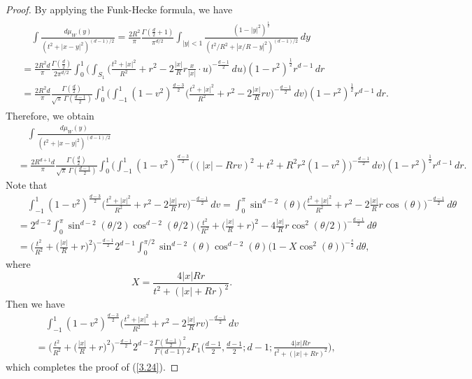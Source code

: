 \documentclass[10pt]{amsart}
\theoremstyle{plain}
\theoremstyle{remark}
\numberwithin{equation}{section}
\begin{document}
\begin{proof}
 


By applying the Funk-Hecke formula, we have  
\begin{align*}
\begin{split} 
&\quad \int \frac{ d\mu_W(y) }{ ( t^2+|x-y|^2 )^{(d-1)/2} }  = \frac{2R^2}{\pi}   \frac{ \Gamma(\frac{d}{2}+1) }{\pi^{ d/2 }}   \int_{ |y|<1 } \frac{ (1-|y|^2)^{ \frac12 } }{  (t^2/R^2+|x/R-y|^2)^{(d-1)/2}  } \,dy
\\
&= \frac{2R^2d}{\pi}   \frac{ \Gamma(\frac{d}{2}) }{2\pi^{ d/2 }} \int_0^1 \bigg( \int_{ S_1 } \Big( \frac{t^2+|x|^2}{R^2}+r^2-2\frac{|x|}{R}r \frac{x}{|x|} \cdot u \Big)^{ -\frac{d-1}{2} } \,du \bigg) (1-r^2)^{\frac12}r^{d-1}\,dr
\\
&= \frac{2R^2d}{\pi} \frac{ \Gamma( \frac{d}{2} ) }{ \sqrt{\pi}\, \Gamma( \frac{d-1}{2} ) }  \int_0^1 \bigg( \int_{-1}^1 (1-v^2)^{ \frac{d-3}{2} }   \Big( \frac{t^2+|x|^2}{R^2}+r^2-2\frac{|x|}{R}r v \Big)^{ -\frac{d-1}{2} } \,dv \bigg) (1-r^2)^{ \frac12 }r^{d-1}\,dr. 
\end{split}
\end{align*} 
Therefore, we obtain
\begin{align*}
&\quad \int \frac{ d\mu_W(y) }{ ( t^2+|x-y|^2 )^{(d-1)/2} } 
\\
&= \frac{2R^{d+1}d}{\pi} \frac{ \Gamma( \frac{d}{2} ) }{ \sqrt{\pi}\, \Gamma( \frac{d-1}{2} ) }  \int_0^1 \bigg( \int_{-1}^1 (1-v^2)^{ \frac{d-3}{2} }   \Big( (|x|-R r v)^2+ t^2  +R^2r^2(1-v^2)\Big)^{ -\frac{d-1}{2} } \,dv \bigg) (1-r^2)^{ \frac12 }r^{d-1}\,dr. 
\end{align*}
Note that  
\begin{align*}
&\quad \int_{-1}^1   (1-v^2)^{ \frac{d-3}{2} } \Big( \frac{t^2+|x|^2}{R^2}+r^2-2\frac{|x|}{R}r v \Big)^{ -\frac{d-1}{2} }   \,dv  = \int_0^{\pi}  \sin^{ d-2 }(\theta) \Big( \frac{t^2+|x|^2}{R^2}+r^2-2\frac{|x|}{R}r \cos (\theta) \Big)^{ -\frac{d-1}{2} }   \,d\theta 
 \\
 &= 2^{d-2}\int_0^{\pi} \sin^{ d-2 }(\theta/2)\cos^{d-2}(\theta/2)  \Big(  \frac{t^2}{R^2}+\Big(\frac{|x|}{R}+r\Big)^2  -4\frac{|x|}{R}r \cos^2 (\theta/2) \Big)^{ -\frac{d-1}{2} }     \,d\theta  
 \\
 &= \bigg( \frac{t^2}{R^2}+\Big(\frac{|x|}{R}+r\Big)^2  \bigg)^{ -\frac{d-1}{2} } 2^{d-1}  \int_0^{\pi/2}  \sin^{ d-2 }(\theta)\cos^{d-2}(\theta) \Big( 1-X \cos^2(\theta) \Big)^{ -\frac{s}{2} }    \,d\theta  ,
\end{align*}
where 
$$
X=  \frac{ 4 |x| R r }{ t^2+( |x|+R r )^2 }. 
$$
Then we have 
\begin{align*}
&\quad  \int_{-1}^1   (1-v^2)^{ \frac{d-3}{2} } \Big( \frac{t^2+|x|^2}{R^2}+r^2-2\frac{|x|}{R}r v \Big)^{ -\frac{d-1}{2} }   \,dv
\\
&=  \bigg( \frac{t^2}{R^2}+\Big(\frac{|x|}{R}+r\Big)^2  \bigg)^{ -\frac{d-1}{2} } 2^{d-2} \frac{ \Gamma( \frac{d-1}{2} )^2 }{ \Gamma(d-1) } {}_2F_1\Big( \frac{d-1}{2}, \frac{d-1}{2}; d-1;  \frac{ 4 |x| R r }{ t^2+( |x|+R r )^2 }\Big),
\end{align*} 
which completes the proof of (\ref{3.24}). 


\end{proof}
\end{document}

